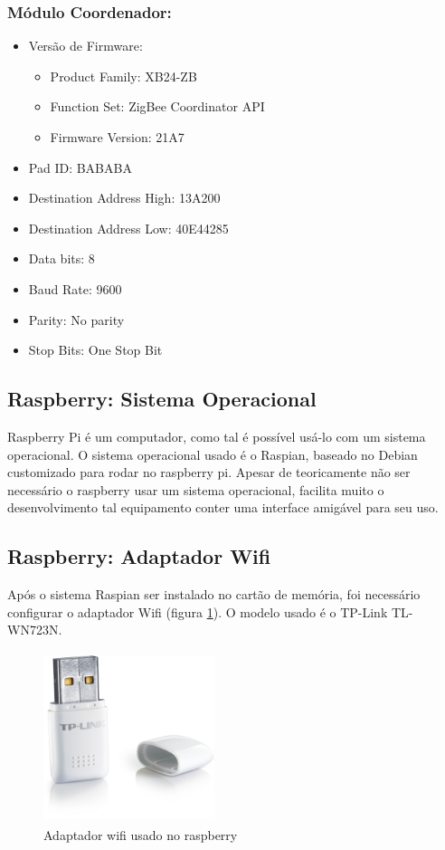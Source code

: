 \subsubsection{Módulo Coordenador:}
\begin{itemize}
	\item Versão de Firmware:
    \begin{itemize}
    	\item Product Family: XB24-ZB
        \item Function Set: ZigBee Coordinator API
        \item Firmware Version: 21A7
    \end{itemize}
    \item Pad ID: BABABA
        \item Destination Address High: 13A200
        \item Destination Address Low: 40E44285
        \item Data bits: 8
        \item Baud Rate: 9600
        \item Parity: No parity
        \item Stop Bits: One Stop Bit
\end{itemize}

\subsection{Raspberry: Sistema Operacional}

Raspberry Pi é um computador, como tal é possível usá-lo com um sistema operacional. O sistema operacional usado é o Raspian, baseado no Debian customizado para rodar no raspberry pi. Apesar de teoricamente não ser necessário o raspberry usar um sistema operacional, facilita muito o desenvolvimento tal equipamento conter uma interface amigável para seu uso.

\subsection{Raspberry: Adaptador Wifi}

Após o sistema Raspian ser instalado no cartão de memória, foi necessário configurar o adaptador Wifi (figura \ref{fig:wifi-adapter}). O modelo usado é o TP-Link TL-WN723N.

\begin{figure}[H]
\centering
\includegraphics[width=5cm,height=5cm,keepaspectratio]{figuras/wifi-adapter.jpg}
\caption{\label{fig:wifi-adapter} Adaptador wifi usado no raspberry}
\end{figure}

